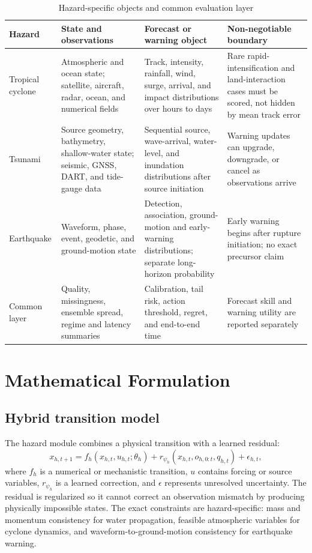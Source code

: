 \documentclass[conference]{IEEEtran}
\begin{document}
\begin{table}[t]
\caption{Hazard-specific objects and common evaluation layer}
\label{tab:hazards}
\centering
\footnotesize
\setlength{\tabcolsep}{3pt}
\begin{tabular}{p{}p{}p{}p{}}
\toprule
Hazard & State and observations & Forecast or warning object & Non-negotiable boundary\\
\midrule
Tropical cyclone & Atmospheric and ocean state; satellite, aircraft, radar, ocean, and numerical fields & Track, intensity, rainfall, wind, surge, arrival, and impact distributions over hours to days & Rare rapid-intensification and land-interaction cases must be scored, not hidden by mean track error\\
Tsunami & Source geometry, bathymetry, shallow-water state; seismic, GNSS, DART, and tide-gauge data & Sequential source, wave-arrival, water-level, and inundation distributions after source initiation & Warning updates can upgrade, downgrade, or cancel as observations arrive\\
Earthquake & Waveform, phase, event, geodetic, and ground-motion state & Detection, association, ground-motion and early-warning distributions; separate long-horizon probability & Early warning begins after rupture initiation; no exact precursor claim\\
Common layer & Quality, missingness, ensemble spread, regime and latency summaries & Calibration, tail risk, action threshold, regret, and end-to-end time & Forecast skill and warning utility are reported separately\\
\bottomrule
\end{tabular}
\end{table}

\section{Mathematical Formulation}

\subsection{Hybrid transition model}

The hazard module combines a physical transition with a learned residual:
\begin{equation}
 x_{h,t+1}=f_h(x_{h,t},u_{h,t};\theta_h)+r_{\psi_h}(x_{h,t},o_{h,0:t},q_{h,t})+\epsilon_{h,t},
 \label{eq:transition}
\end{equation}
where $f_h$ is a numerical or mechanistic transition, $u$ contains forcing or source variables, $r_{\psi_h}$ is a learned correction, and $\epsilon$ represents unresolved uncertainty. The residual is regularized so it cannot correct an observation mismatch by producing physically impossible states. The exact constraints are hazard-specific: mass and momentum consistency for water propagation, feasible atmospheric variables for cyclone dynamics, and waveform-to-ground-motion consistency for earthquake warning.
\end{document}
